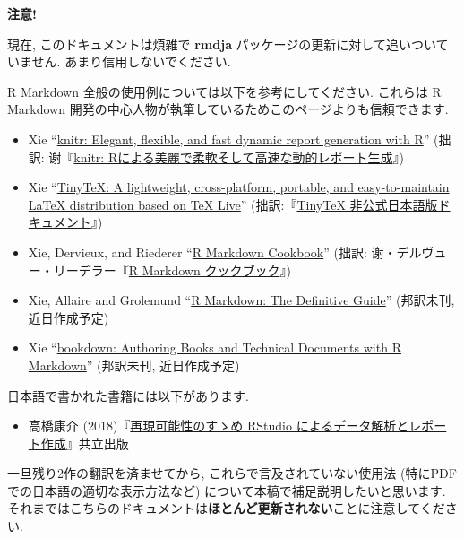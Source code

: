\documentclass[
  xelatex,ja=standard,jafont=noto]{bxjsbook}
\providecommand{\tightlist}{%
  \setlength{\itemsep}{0pt}\setlength{\parskip}{0pt}}
\newenvironment{infobox}[1]{\begin{itemize}\renewcommand{\labelitemi}{\raisebox{-.7\height}[0pt][0pt]{%
  {\setkeys{Gin}{width=3em,keepaspectratio}\texttt{[image: \_latex/\_img/\#1]}}}}
  \setlength{\fboxsep}{1em}
  \begin{greyblock}
  \item
  }{\end{greyblock}\end{itemize}
}
\theoremstyle{definition}
\theoremstyle{definition}
\theoremstyle{definition}
\theoremstyle{definition}
\theoremstyle{remark}
\begin{document}
\begin{infobox}{caution}
\textbf{注意!}

現在, このドキュメントは煩雑で \textbf{rmdja}
パッケージの更新に対して追いついていません. あまり信用しないでください.

R Markdown 全般の使用例については以下を参考にしてください. これらは R
Markdown 開発の中心人物が執筆しているためこのページよりも信頼できます.

\begin{itemize}
\tightlist
\item
  Xie ``\href{https://yihui.org/knitr/}{knitr: Elegant, flexible, and
  fast dynamic report generation with R}'' (拙訳:
  谢『\href{https://gedevan-aleksizde.github.io/knitr-doc-ja/index.html}{knitr:
  Rによる美麗で柔軟そして高速な動的レポート生成}』)
\item
  Xie ``\href{https://yihui.org/tinytex/}{TinyTeX: A lightweight,
  cross-platform, portable, and easy-to-maintain LaTeX distribution
  based on TeX Live}''
  (拙訳:『\href{https://gedevan-aleksizde.github.io/tinytex-doc-ja/}{TinyTeX
  非公式日本語版ドキュメント}』)
\item
  Xie, Dervieux, and Riederer
  ``\href{https://bookdown.org/yihui/rmarkdown-cookbook/}{R Markdown
  Cookbook}'' (拙訳:
  谢・デルヴュー・リーデラー『\href{https://gedevan-aleksizde.github.io/rmarkdown-cookbook/}{R
  Markdown クックブック}』)
\item
  Xie, Allaire and Grolemund
  ``\href{https://bookdown.org/yihui/rmarkdown/}{R Markdown: The
  Definitive Guide}'' (邦訳未刊, 近日作成予定)
\item
  Xie ``\href{https://bookdown.org/yihui/bookdown/}{bookdown: Authoring
  Books and Technical Documents with R Markdown}'' (邦訳未刊,
  近日作成予定)
\end{itemize}

日本語で書かれた書籍には以下があります.

\begin{itemize}
\tightlist
\item
  高橋康介
  (2018)『\href{https://www.kyoritsu-pub.co.jp/bookdetail/9784320112438}{再現可能性のすゝめ
  RStudio によるデータ解析とレポート作成}』共立出版
\end{itemize}

一旦残り2作の翻訳を済ませてから, これらで言及されていない使用法
(特にPDFでの日本語の適切な表示方法など)
について本稿で補足説明したいと思います.
それまではこちらのドキュメントは\textbf{ほとんど更新されない}ことに注意してください.

\end{infobox}
\end{document}
